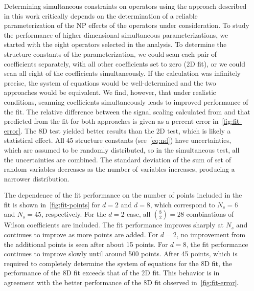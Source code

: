 Determining simultaneous constraints on operators using the approach described
in this work critically depends on the determination of a reliable
parameterization of the NP effects of the operators under consideration. To
study the performance of higher dimensional simultaneous parameterizations, we
started with the eight operators selected in the \thirteenTeV analysis. To
determine the structure constants of the parameterization, we could scan each
pair of coefficients separately, with all other coefficients set to zero (2D
fit), or we could scan all eight of the coefficients simultaneously. If the
\madgraph calculation was infinitely precise, the system of equations would be
well-determined and the two approaches would be equivalent. We find, however,
that under realistic conditions, scanning coefficients simultaneously leads to
improved performance of the fit. The relative difference between the signal
scaling calculated from \madgraph and that predicted from the fit for both
approaches is given as a percent error in~\cref{fig:fit-error}. The 8D test
yielded better results than the 2D test, which is likely a statistical effect.
All 45 structure constants (see~\cref{eq:nd}) have uncertainties, which are
assumed to be randomly distributed, so in the simultaneous test, all the
uncertainties are combined. The standard deviation of the sum of set of random
variables decreases as the number of variables increases, producing a narrower
distribution.

The dependence of the fit performance on the number of points included in the
fit is shown in~\cref{fig:fit-points} for $d=2$ and $d=8$, which correspond to
$N_s = 6$ and $N_s = 45$, respectively. For the $d=2$ case, all $\binom{8}{2} =
28$ combinations of Wilson coefficients are included. The fit performance
improves sharply at $N_s$ and continues to improve as more points are added. For
$d=2$, no improvement from the additional points is seen after about \num{15}
points. For $d=8$, the fit performance continues to improve slowly until around
\num{500} points. After \num{45} points, which is required to completely
determine the system of equations for the 8D fit, the performance of the 8D fit
exceeds that of the 2D fit. This behavior is in agreement with the better
performance of the 8D fit observed in~\cref{fig:fit-error}.

